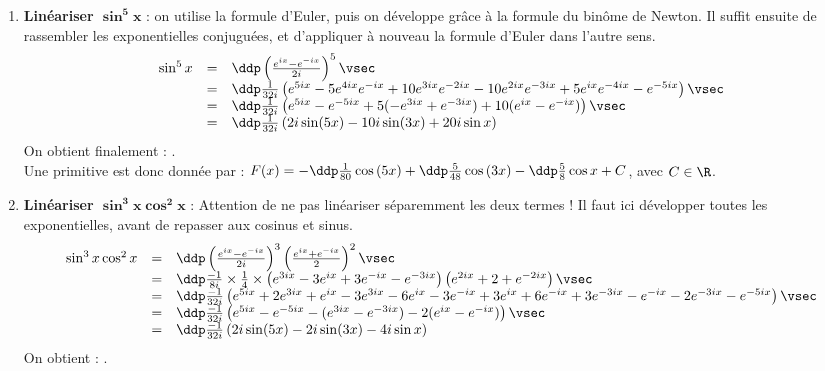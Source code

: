 
\begin{correction}   \;
\begin{enumerate}
\item \textbf{Lin\'eariser $\mathbf{\sin^5{x}}$} : on utilise la formule d'Euler, puis on d\'eveloppe gr\^ace \`a la formule du bin\^ome de Newton. Il suffit ensuite de rassembler les exponentielles conjugu\'ees, et d'appliquer \`a nouveau la formule d'Euler dans l'autre sens.
$$\begin{array}{rcl}
\sin^5 x & = & \ddp \left( \frac{e^{ix} - e^{-i x}}{2i} \right)^5\vsec\\
& =& \ddp \frac{1}{32 i} \left( e^{5ix} - 5 e^{4ix}e^{-ix} + 10 e^{3ix} e^{-2ix} - 10 e^{2ix}e^{-3ix} + 5 e^{ix}e^{-4ix} - e^{-5ix}\right)\vsec\\
& =& \ddp \frac{1}{32 i} \left( e^{5ix} - e^{-5ix} + 5 (-e^{3ix} + e^{-3ix}) + 10 (e^{ix} - e^{-ix} ) \right)\vsec\\
& = & \ddp \frac{1}{32 i} \left( 2i \sin(5x) - 10i \sin(3x) + 20 i\sin x\right) 
\end{array}$$
On obtient finalement : .\\
Une primitive est donc donn\'ee par : $F(x) = -\ddp\frac{1}{80}\cos{(5x)}+\ddp\frac{5}{48}\cos{(3x)}-\ddp\frac{5}{8}\cos{x}+C$, avec $C \in \R$.
\item \textbf{Lin\'eariser $\mathbf{\sin^3{x}\cos^2{x}}$} : Attention de ne pas lin\'eariser s\'eparemment les deux termes ! Il faut ici d\'evelopper toutes les exponentielles, avant de repasser aux cosinus et sinus.
$$\begin{array}{rcl}
\sin^3{x}\cos^2{x} & = &\ddp \left( \frac{e^{ix}-e^{-ix}}{2i}\right)^3 \left( \frac{e^{ix}+e^{-ix}}{2}\right)^2\vsec\\
& = & \ddp \frac{-1}{8i} \times \frac{1}{4} \times \left(e^{3ix} - 3 e^{ix} + 3 e^{-ix} - e^{-3ix}\right) \left(e^{2ix} + 2 + e^{-2ix}\right)\vsec\\
& = & \ddp \frac{-1}{32i} \left(e^{5ix} + 2e^{3ix} + e^{ix} - 3e^{3ix} - 6 e^{ix} - 3 e^{-ix} + 3 e^{ix} + 6 e^{-ix} + 3 e^{-3ix} - e^{-ix} - 2 e^{-3ix} - e^{-5ix} \right)\vsec\\
& = & \ddp \frac{-1}{32i} \left(e^{5ix} - e^{-5ix} - (e^{3ix} - e^{-3ix}) - 2 (e^{ix} - e^{-ix})\right)\vsec\\
& = & \ddp \frac{-1}{32i} \left(2i \sin (5x) - 2i \sin(3x) - 4i \sin x\right)
\end{array}$$
On obtient : .\\

\end{enumerate}
\end{correction}
